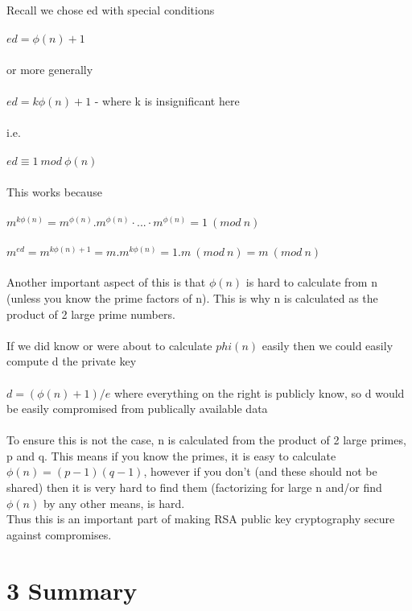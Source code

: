 \documentclass[11pt]{article}   	%
\begin{document}
Recall we chose ed with special conditions \\
\\
$ ed = \phi(n) + 1 $ \\
\\
or more generally \\
\\
$ ed = k\phi(n) + 1 $ - where k is insignificant here \\
\\
i.e. \\
\\
$ ed \equiv 1 \  mod \ \phi(n) $ \\
\\
This works because \\
\\
$ m^{k \phi(n)} = m^{\phi(n)} . m^{\phi(n)} · . . . · m^{\phi(n)} = 1 \ (mod \ n) $ \\
\\
$ m^{ed} = m^{k\phi(n) + 1} = m . m^{k \phi(n)} = 1.m \ (mod \ n) = m \ (mod \ n) $ \\
\\
Another important aspect of this is that $ \phi(n) $ is hard to calculate from n (unless you know the prime factors of n). This is why n is calculated as the product of 2 large prime numbers. \\
\\
If we did know or were about to calculate $ phi(n) $ easily then we could easily compute d the private key \\
\\
$ d = (\phi(n) + 1) / e $ where everything on the right is publicly know, so d would be easily compromised from publically available data \\
\\
To ensure this is not the case, n is calculated from the product of 2 large primes, p and q. This means if you know the primes, it is easy to calculate $ \phi(n) = (p-1)(q-1) $, however if you don't (and these should not be shared) then it is very hard to find them (factorizing for large n and/or find $ \phi(n) $ by any other means, is hard. \\
Thus this is an important part of making RSA public key cryptography secure against compromises. 

\break

\section*{3 Summary}
\end{document}
